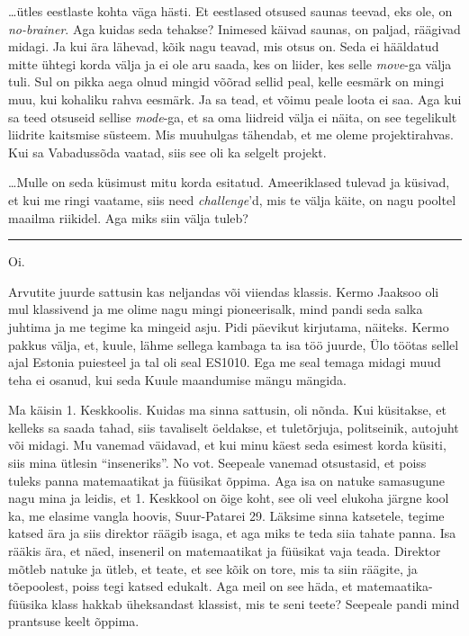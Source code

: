 
\ldots ütles eestlaste kohta väga hästi. Et eestlased otsused saunas 
teevad, eks ole, on \emph{no-brainer}. Aga kuidas seda tehakse? 
Inimesed käivad saunas, on paljad, räägivad midagi. Ja  kui ära 
lähevad, kõik nagu teavad, mis otsus on. Seda ei hääldatud mitte ühtegi korda 
välja 
ja ei ole aru saada, kes on liider, kes selle \emph{move}-ga välja tuli. 
Sul on pikka aega olnud mingid võõrad sellid peal, 
kelle eesmärk on mingi muu, kui kohaliku rahva eesmärk. Ja sa tead, et võimu 
peale loota ei saa. Aga kui sa teed otsuseid sellise \emph{mode}-ga, et sa oma 
liidreid välja ei näita, on see tegelikult liidrite kaitsmise süsteem. Mis 
muuhulgas tähendab, et me oleme projektirahvas. Kui sa  Vabadussõda vaatad, 
siis see oli ka selgelt projekt.
                 
\ldots Mulle on seda küsimust mitu korda esitatud. Ameeriklased tulevad ja 
küsivad, et kui me ringi vaatame, siis need \emph{challenge}'d, mis te 
välja käite, on nagu pooltel maailma riikidel. Aga miks siin välja tuleb?

\bigskip
\noindent\rule{.3\textwidth}{.7pt}
\bigskip
                 

Oi.

Arvutite juurde  sattusin kas neljandas või viiendas klassis. Kermo 
Jaaksoo  oli mul  klassivend ja me olime nagu mingi 
pioneerisalk, mind pandi seda salka juhtima ja me tegime ka 
mingeid asju. Pidi päevikut kirjutama, näiteks. Kermo pakkus välja, et, 
kuule, lähme sellega kambaga ta isa töö juurde, Ülo töötas sellel ajal 
Estonia puiesteel ja tal oli seal ES1010. Ega me seal temaga midagi muud teha ei 
osanud, kui seda Kuule maandumise mängu mängida. 

Ma käisin 1. Keskkoolis.  Kuidas ma sinna 
sattusin, oli  nõnda. Kui küsitakse, et kelleks sa saada tahad, siis tavaliselt 
öeldakse, et  tuletõrjuja, politseinik, autojuht või midagi. Mu vanemad 
väidavad, 
et kui minu käest seda esimest korda küsiti, siis mina ütlesin 
\enquote{inseneriks}. 
No vot. Seepeale 
vanemad otsustasid, et poiss tuleks panna matemaatikat ja füüsikat õppima. Aga 
isa on natuke samasugune nagu mina ja leidis, et 1. Keskkool on õige koht, see 
oli veel elukoha järgne kool ka, me elasime vangla hoovis,  Suur-Patarei 29. 
Läksime sinna katsetele, tegime katsed ära ja siis direktor räägib isaga, et 
aga miks te teda siia tahate panna. Isa rääkis ära, et näed, inseneril on 
matemaatikat ja füüsikat vaja teada. Direktor mõtleb natuke ja ütleb, et teate, 
et see kõik on tore, mis ta siin räägite, ja tõepoolest, poiss tegi katsed 
edukalt. Aga meil on see häda, et matemaatika-füüsika klass hakkab üheksandast 
klassist, mis te seni teete? Seepeale pandi mind prantsuse keelt õppima.

